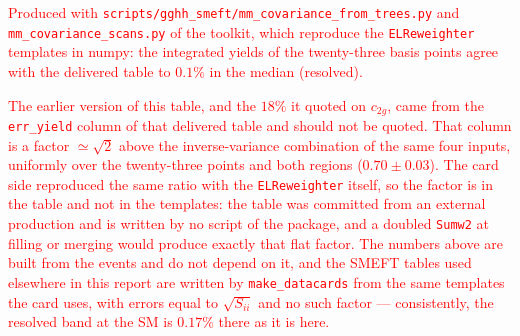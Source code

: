 \textcolor{red}{Produced with \texttt{scripts/gghh\_smeft/mm\_covariance\_from\_trees.py}
and \texttt{mm\_covariance\_scans.py} of the toolkit, which reproduce the
\texttt{ELReweighter} templates in numpy: the integrated yields of the twenty-three basis
points agree with the delivered table to $0.1\%$ in the median (resolved).}

\textcolor{red}{The earlier version of this table, and the $18\%$ it quoted on $c_{2g}$,
came from the \texttt{err\_yield} column of that delivered table and should not be
quoted. That column is a factor $\simeq\sqrt{2}$ above the inverse-variance combination
of the same four inputs, uniformly over the twenty-three points and both regions
($0.70\pm0.03$). The card side reproduced the same ratio with the \texttt{ELReweighter}
itself, so the factor is in the table and not in the templates: the table was committed
from an external production and is written by no script of the package, and a doubled
\texttt{Sumw2} at filling or merging would produce exactly that flat factor. The numbers
above are built from the events and do not depend on it, and the SMEFT tables used
elsewhere in this report are written by \texttt{make\_datacards} from the same templates
the card uses, with errors equal to $\sqrt{S_{ii}}$ and no such factor --- consistently,
the resolved band at the SM is $0.17\%$ there as it is here.}

